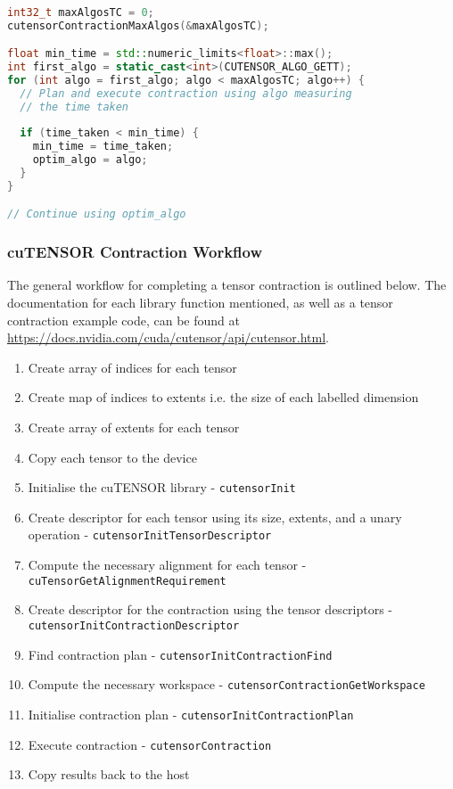 \begin{lstlisting}[language=C++, label=cutensor::optim_example, basicstyle=\small, caption=Finding the most efficient 
algorithm]

int32_t maxAlgosTC = 0;
cutensorContractionMaxAlgos(&maxAlgosTC);

float min_time = std::numeric_limits<float>::max();
int first_algo = static_cast<int>(CUTENSOR_ALGO_GETT);
for (int algo = first_algo; algo < maxAlgosTC; algo++) {
  // Plan and execute contraction using algo measuring
  // the time taken
  
  if (time_taken < min_time) {
    min_time = time_taken;
    optim_algo = algo;
  }
}

// Continue using optim_algo
\end{lstlisting}

\subsubsection{cuTENSOR Contraction Workflow} \label{cutensor::workflow}
The general workflow for completing a tensor contraction is outlined below. The documentation for each library function mentioned, as well as a tensor contraction example code, can be found at \url{https://docs.nvidia.com/cuda/cutensor/api/cutensor.html}.

\begin{enumerate}
\item Create array of indices for each tensor
\item Create map of indices to extents i.e. the size of each labelled dimension
\item Create array of extents for each tensor
\item Copy each tensor to the device
\item Initialise the cuTENSOR library - \texttt{cutensorInit}
\item Create descriptor for each tensor using its size, extents, and a unary operation - \texttt{cutensorInitTensorDescriptor}
\item Compute the necessary alignment for each tensor - \texttt{cuTensorGetAlign\-mentRequirement}
\item Create descriptor for the contraction using the tensor descriptors - \texttt{cutensorInitContractionDescriptor}
\item Find contraction plan - \texttt{cutensorInitContractionFind}
\item Compute the necessary workspace - \texttt{cutensorContractionGetWorksp\-ace}
\item Initialise contraction plan - \texttt{cutensorInitContractionPlan}
\item Execute contraction - \texttt{cutensorContraction}
\item Copy results back to the host
\end{enumerate}

